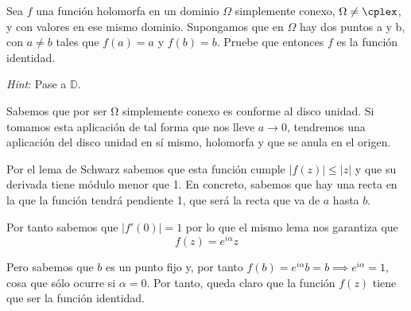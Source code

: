 \begin{problem}[4]
Sea $f$ una función holomorfa en un dominio $\Omega$ simplemente conexo, $\Omega \neq \cplex$, y con valores en ese mismo dominio. Supongamos que en $\Omega$ hay dos puntos a y b, con $a \neq b$ tales que $f(a) = a$ y $f(b) = b$. Pruebe que entonces $f$ es la función identidad.

{\it Hint}: Pase a $\mathbb{D}$.
\solution


Sabemos que por ser Ω simplemente conexo es conforme al disco unidad. Si tomamos esta aplicación de tal forma que nos lleve $a \to 0$, tendremos una aplicación del disco unidad en sí mismo, holomorfa y que se anula en el origen.

Por el lema de Schwarz sabemos que esta función cumple $|f(z)|\leq |z|$ y que su derivada tiene módulo menor que 1. En concreto, sabemos que hay una recta en la que la función tendrá pendiente 1, que será la recta que va de $a$ hasta $b$.

Por tanto sabemos que $|f'(0)| = 1$ por lo que el mismo lema nos garantiza que
\[f(z)=e^{iα}z\]

Pero sabemos que $b$ es un punto fijo y, por tanto $f(b)=e^{iα}b=b \implies e^{iα}=1$, cosa que sólo ocurre si $α=0$. Por tanto, queda claro que la función $f(z)$ tiene que ser la función identidad.

\end{problem}


